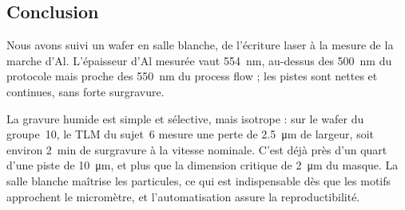 \subsection{Conclusion}
Nous avons suivi un wafer en salle blanche, de l'écriture laser à la mesure de la marche d'Al. L'épaisseur d'Al mesurée vaut \qty{554}{\nano\metre}, au-dessus des \qty{500}{\nano\metre} du protocole mais proche des \qty{550}{\nano\metre} du process flow ; les pistes sont nettes et continues, sans forte surgravure.

La gravure humide est simple et sélective, mais isotrope : sur le wafer du groupe~10, le TLM du sujet~6 mesure une perte de \qty{2,5}{\micro\metre} de largeur, soit environ \qty{2}{\minute} de surgravure à la vitesse nominale. C'est déjà près d'un quart d'une piste de \qty{10}{\micro\metre}, et plus que la dimension critique de \qty{2}{\micro\metre} du masque. La salle blanche maîtrise les particules, ce qui est indispensable dès que les motifs approchent le micromètre, et l'automatisation assure la reproductibilité.
